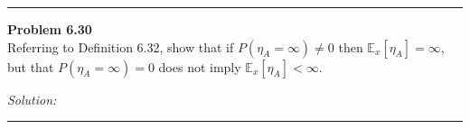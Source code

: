 \documentclass[a4paper, 11pt]{article}
\newenvironment{problem}[2][Problem]
    { \begin{mdframed}[backgroundcolor=gray!20] \textbf{#1 #2} \\}
    {  \end{mdframed}}
\newenvironment{solution}
    {\textit{Solution:}}
    {}
\begin{document}
\noindent\rule{7in}{2.8pt}
\begin{problem}{6.30}
Referring to Definition 6.32, show that if $P\left(\eta_{A}=\infty\right) \neq 0$ then $\mathbb{E}_{x}\left[\eta_{A}\right]=\infty$,
but that $P\left(\eta_{A}=\infty\right)=0$ does not imply $\mathbb{E}_{x}\left[\eta_{A}\right]<\infty$.
\end{problem}
\begin{solution}

\end{solution}

\noindent\rule{7in}{2.8pt}
\end{document}
